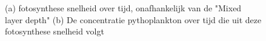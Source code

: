 \begin{figure}[H]


    \caption{(a) fotosynthese snelheid over tijd, onafhankelijk van de "Mixed layer depth" (b) De concentratie pythoplankton over tijd die uit deze fotosynthese snelheid volgt}
    \label{fig:alphamixedlayer}
\end{figure}
 
